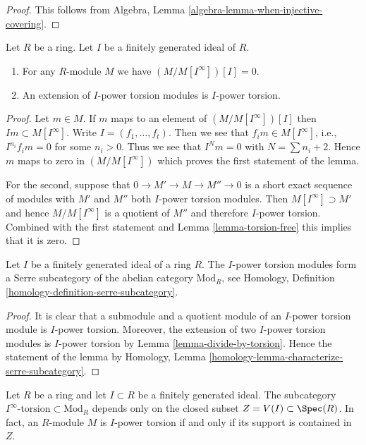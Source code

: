 \begin{proof}
This follows from
Algebra, Lemma \ref{algebra-lemma-when-injective-covering}.
\end{proof}

\begin{lemma}
\label{lemma-divide-by-torsion}
Let $R$ be a ring. Let $I$ be a finitely generated ideal of $R$.
\begin{enumerate}
\item For any $R$-module $M$ we have $(M/M[I^\infty])[I] = 0$.
\item An extension of $I$-power torsion modules is $I$-power torsion.
\end{enumerate}
\end{lemma}

\begin{proof}
Let $m \in M$. If $m$ maps to an element of $(M/M[I^\infty])[I]$
then $Im \subset M[I^\infty]$.
Write $I = (f_1, \ldots, f_t)$. Then we see that
$f_i m \in M[I^\infty]$, i.e., $I^{n_i}f_i m = 0$ for some $n_i > 0$.
Thus we see that $I^Nm = 0$ with $N = \sum n_i + 2$.
Hence $m$ maps to zero in $(M/M[I^\infty])$ which proves the
first statement of the lemma.

\medskip\noindent
For the second, suppose that $0 \to M' \to M \to M'' \to 0$ is a short
exact sequence of modules with $M'$ and $M''$ both $I$-power torsion
modules. Then $M[I^\infty] \supset M'$ and hence $M/M[I^\infty]$ is a
quotient of $M''$ and therefore $I$-power torsion. Combined with
the first statement and Lemma \ref{lemma-torsion-free} this implies
that it is zero.
\end{proof}

\begin{lemma}
\label{lemma-I-power-torsion}
Let $I$ be a finitely generated ideal of a ring $R$.
The $I$-power torsion modules form a Serre subcategory of
the abelian category $\text{Mod}_R$, see
Homology, Definition \ref{homology-definition-serre-subcategory}.
\end{lemma}

\begin{proof}
It is clear that a submodule and a quotient module of an $I$-power
torsion module is $I$-power torsion. Moreover, the extension
of two $I$-power torsion modules is $I$-power torsion by
Lemma \ref{lemma-divide-by-torsion}.
Hence the statement of the lemma by
Homology, Lemma \ref{homology-lemma-characterize-serre-subcategory}.
\end{proof}

\begin{lemma}
\label{lemma-local-cohomology-closed}
Let $R$ be a ring and let $I \subset R$ be a finitely generated ideal.
The subcategory $I^\infty\text{-torsion} \subset \text{Mod}_R$
depends only on the closed subset $Z = V(I) \subset \Spec(R)$.
In fact, an $R$-module $M$ is $I$-power torsion if and only if its
support is contained in $Z$.
\end{lemma}


